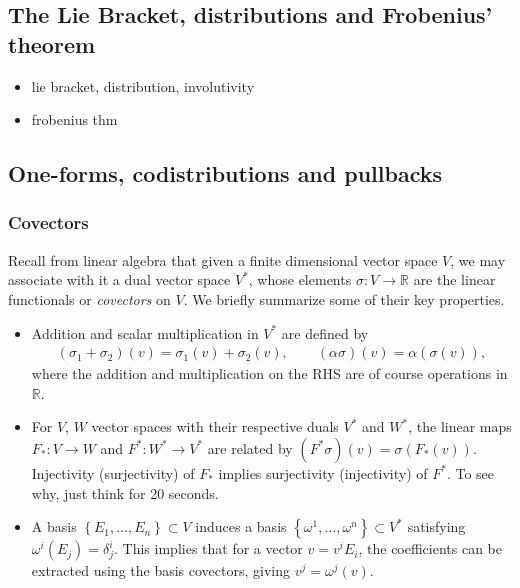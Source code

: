 \documentclass[psamsfonts]{amsart}
\theoremstyle{definition}
\theoremstyle{remark}
\newcommand*\R{\mathds{R}}
\numberwithin{equation}{section}
\begin{document}
\subsection{The Lie Bracket, distributions and Frobenius' theorem}\label{sec:prelim-frobenius}

{\color{blue}
\begin{itemize}
    \item lie bracket, distribution, involutivity
    \item frobenius thm
\end{itemize}

}



\subsection{One-forms, codistributions and pullbacks}\label{sec:1FandCodistrib}
\subsubsection{Covectors}\label{sec:covectors}

Recall from linear algebra that given a finite dimensional vector space $V$, we may associate with it a dual vector space $V^*$, whose elements $\sigma : V \rightarrow \R$ are the linear functionals or \textit{covectors} on $V$. We briefly summarize some of their key properties. 

\begin{itemize}
    \item Addition and scalar multiplication in $V^*$ are defined by
\begin{equation*}
\begin{aligned}
\left( \sigma_1 + \sigma_2 \right)(v) = \sigma_1(v)+\sigma_2(v), \qquad (\alpha \sigma) (v) = \alpha \left(\sigma(v)\right), 
\end{aligned}
\end{equation*}
where the addition and multiplication on the RHS are of course operations in $\R$. 
    \item For $V$, $W$ vector spaces with their respective duals $V^*$ and $W^*$, the linear maps $F_*:V\rightarrow W$ and $F^*:W^*\rightarrow V^*$ are related by $(F^*\sigma)(v) = \sigma (F_*(v))$. Injectivity (surjectivity) of $F_*$ implies surjectivity (injectivity) of $F^*$. To see why, just think for 20 seconds. 
    \item A basis $\left\{E_1, \dots, E_n\right\} \subset V$ induces a basis $\left\{\omega^1, \dots, \omega^n\right\} \subset V^*$ satisfying $\omega^i(E_j) = \delta^i_j$. This implies that for a vector $v = v^i E_i$, the coefficients can be extracted using the basis covectors, giving $v^j = \omega^j(v)$. 
\end{itemize}
\end{document}
